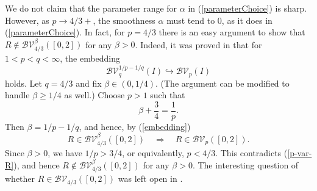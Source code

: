 \documentclass{amsart}
\numberwithin{equation}{section}
\begin{document}
We do not claim that the parameter range for $\alpha$ in (\ref{parameterChoice}) is sharp. However, as $p\rightarrow4/3+$, the smoothness $\alpha$ must tend to 0, as it does in (\ref{parameterChoice}). In fact, for $p=4/3$ there is an easy argument to show that $R\notin\mathcal{BV}^\beta_{4/3}([0,2])$ for any $\beta>0$. Indeed, it was proved in \cite{KoLi12} that for $1<p<q<\infty$, the embedding
\begin{equation}
    \label{embedding}
    \mathcal{BV}_q^{1/p-1/q}(I)\hookrightarrow\mathcal{BV}_p(I)
\end{equation}
holds. Let $q=4/3$ and fix $\beta\in(0,1/4)$. (The argument can be modified to handle $\beta\ge1/4$ as well.) Choose $p>1$ such 
that
\begin{equation}
    \nonumber
    \beta+\frac{3}{4}=\frac{1}{p}.
\end{equation}
Then $\beta=1/p-1/q$, and hence, by (\ref{embedding})
\begin{equation}
    \nonumber
    R\in\mathcal{BV}_{4/3}^\beta([0,2])\quad\Rightarrow\quad R\in\mathcal{BV}_p([0,2]).
\end{equation}
Since $\beta>0$, we have $1/p>3/4$, or equivalently, $p<4/3$. This contradicts (\ref{p-var-R}), and hence $R\notin\mathcal{BV}_{4/3}^\beta([0,2])$ for any $\beta>0$. The interesting question of whether $R\in\mathcal{BV}_{4/3}([0,2])$ was left open in \cite{Li26}.
\end{document}
